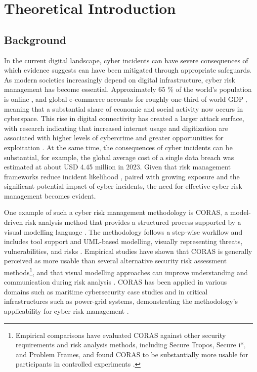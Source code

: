 \chapter{Theoretical Introduction}
\section{Background}

In the current digital landscape, cyber incidents can have severe consequences of which evidence suggests can have been mitigated through appropriate safeguards. As modern societies increasingly depend on digital infrastructure, cyber risk management has become essential. Approximately 65 \% of the world's population is online \citep{hanji_machine_2023}, and global e-commerce accounts for roughly one-third of world GDP \citep{wysokinska_global_2023}, meaning that a substantial share of economic and social activity now occurs in cyberspace. This rise in digital connectivity has created a larger attack surface, with research indicating that increased internet usage and digitization are associated with higher levels of cybercrime and greater opportunities for exploitation \citep{figueiredo_alves_silva_digital_2024}. At the same time, the consequences of cyber incidents can be substantial, for example, the global average cost of a single data breach was estimated at about USD 4.45 million in 2023. Given that risk management frameworks reduce incident likelihood \citep{jung_effect_2025}, paired with growing exposure and the significant potential impact of cyber incidents, the need for effective cyber risk management becomes evident.

One example of such a cyber risk management methodology is CORAS, a model-driven risk analysis method that provides a structured process supported by a visual modelling language \citep{kpoze_cybersecurity_2023}. The methodology follows a step-wise workflow and includes tool support and UML-based modelling, visually representing threats, vulnerabilities, and risks \citep{kpoze_cybersecurity_2023}. Empirical studies have shown that CORAS is generally perceived as more usable than several alternative security risk assessment methods\footnote{Empirical comparisons have evaluated CORAS against other security requirements and risk analysis methods, including Secure Tropos, Secure i*, and Problem Frames, and found CORAS to be substantially more usable for participants in controlled experiments \citep{broccia_evaluating_2025}.}, and that visual modelling approaches can improve understanding and communication during risk analysis \citep{broccia_evaluating_2025}. CORAS has been applied in various domains such as maritime cybersecurity case studies and in critical infrastructures such as power-grid systems, demonstrating the methodology's applicability for cyber risk management \citep{kpoze_cybersecurity_2023,erbas_systematic_2024}.

